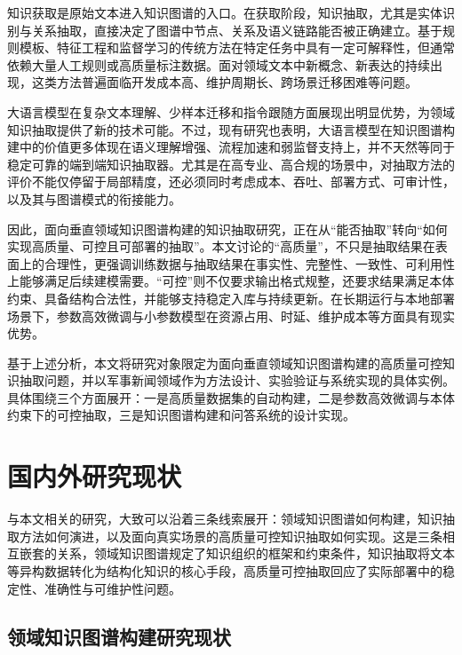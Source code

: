 知识获取是原始文本进入知识图谱的入口\cite{Zhong2023AutomaticKGConstructionSurvey}。在获取阶段，知识抽取，尤其是实体识别与关系抽取，直接决定了图谱中节点、关系及语义链路能否被正确建立\cite{Zhao2024RelationExtractionSurvey}。基于规则模板、特征工程和监督学习的传统方法在特定任务中具有一定可解释性，但通常依赖大量人工规则或高质量标注数据。面对领域文本中新概念、新表达的持续出现，这类方法普遍面临开发成本高、维护周期长、跨场景迁移困难等问题\cite{Zhao2024RelationExtractionSurvey,Deng2024LowResourceIESurvey}。

大语言模型在复杂文本理解、少样本迁移和指令跟随方面展现出明显优势，为领域知识抽取提供了新的技术可能。不过，现有研究也表明，大语言模型在知识图谱构建中的价值更多体现在语义理解增强、流程加速和弱监督支持上，并不天然等同于稳定可靠的端到端知识抽取器\cite{Zhu2024LLMsForKGConstructionAndReasoning}。尤其是在高专业、高合规的场景中，对抽取方法的评价不能仅停留于局部精度，还必须同时考虑成本、吞吐、部署方式、可审计性，以及其与图谱模式的衔接能力。

因此，面向垂直领域知识图谱构建的知识抽取研究，正在从“能否抽取”转向“如何实现高质量、可控且可部署的抽取”。本文讨论的“高质量”，不只是抽取结果在表面上的合理性，更强调训练数据与抽取结果在事实性、完整性、一致性、可利用性上能够满足后续建模需要。“可控”则不仅要求输出格式规整，还要求结果满足本体约束、具备结构合法性，并能够支持稳定入库与持续更新\cite{Tan2024LLMDataAnnotationSurvey,Klie2024AnalyzingAnnotationQualityManagement}。在长期运行与本地部署场景下，参数高效微调与小参数模型在资源占用、时延、维护成本等方面具有现实优势\cite{Hu2022LoRA,Dettmers2023QLoRA,Han2024PEFTSurvey,Lu2024SmallLanguageModels}。

基于上述分析，本文将研究对象限定为面向垂直领域知识图谱构建的高质量可控知识抽取问题，并以军事新闻领域作为方法设计、实验验证与系统实现的具体实例。具体围绕三个方面展开：一是高质量数据集的自动构建，二是参数高效微调与本体约束下的可控抽取，三是知识图谱构建和问答系统的设计实现。

\section{国内外研究现状}

与本文相关的研究，大致可以沿着三条线索展开：领域知识图谱如何构建，知识抽取方法如何演进，以及面向真实场景的高质量可控知识抽取如何实现。这是三条相互嵌套的关系，领域知识图谱规定了知识组织的框架和约束条件，知识抽取将文本等异构数据转化为结构化知识的核心手段，高质量可控抽取回应了实际部署中的稳定性、准确性与可维护性问题。

\subsection{领域知识图谱构建研究现状}

